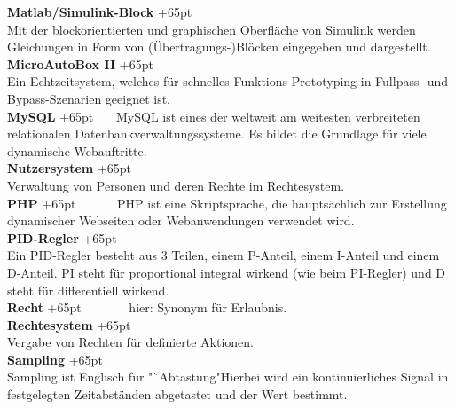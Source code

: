 \documentclass[fontsize = 12pt, paper = a4]{scrreprt}
\begin{document}
\textbf{Matlab/Simulink-Block}
\hangindent+65pt  \\
Mit der blockorientierten und graphischen Oberfläche von Simulink werden Gleichungen in Form von (Übertragungs-)Blöcken eingegeben und dargestellt.\\

\textbf{MicroAutoBox II}
\hangindent+65pt  \\
Ein Echtzeitsystem, welches für schnelles Funktions-Prototyping in Fullpass- und Bypass-Szenarien geeignet ist.\\


\textbf{MySQL}
\hangindent+65pt  
\ \ \  MySQL ist eines der weltweit am weitesten verbreiteten relationalen Datenbankverwaltungssysteme. Es bildet die Grundlage für viele dynamische Webauftritte.\\

\textbf{Nutzersystem}
\hangindent+65pt  \\
Verwaltung von Personen und deren Rechte im Rechtesystem.\\



\textbf{PHP}
\hangindent+65pt 
\ \ \ \ \ \ PHP ist eine Skriptsprache, die hauptsächlich zur Erstellung dynamischer Webseiten oder Webanwendungen verwendet wird.\\

\textbf{PID-Regler}
\hangindent+65pt  \\
Ein PID-Regler besteht aus 3 Teilen, einem P-Anteil, einem I-Anteil und einem D-Anteil. PI steht für proportional integral wirkend (wie beim PI-Regler) und D steht für differentiell wirkend.\\

\textbf{Recht}
\hangindent+65pt  
\ \ \ \ \ \ \ hier: Synonym für Erlaubnis.\\

\textbf{Rechtesystem}
\hangindent+65pt  \\
Vergabe von Rechten für definierte Aktionen.\\

\textbf{Sampling}
\hangindent+65pt  \\
Sampling ist Englisch für "`Abtastung"\. Hierbei wird ein kontinuierliches Signal in festgelegten Zeitabständen abgetastet und der Wert bestimmt.\\
\end{document}
